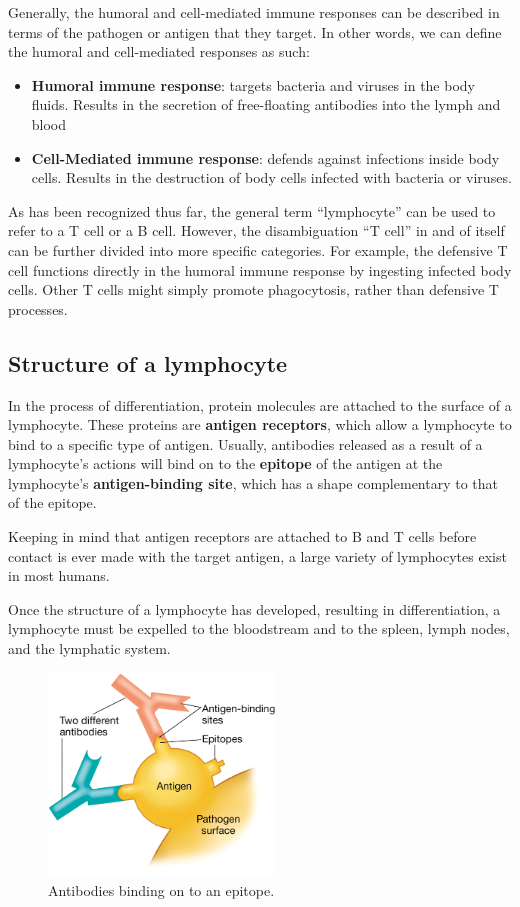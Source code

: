 \documentclass{article}
\begin{document}
Generally, the humoral and cell-mediated immune responses can be described in
terms of the pathogen or antigen that they target. In other words, we can
define the humoral and cell-mediated responses as such:

\begin{itemize}
	\item \textbf{Humoral immune response}: targets bacteria and viruses in the
		body fluids. Results in the secretion of free-floating antibodies into
		the lymph and blood
	\item \textbf{Cell-Mediated immune response}: defends against infections
		inside body cells. Results in the destruction of body cells infected
		with bacteria or viruses.
\end{itemize}

As has been recognized thus far, the general term ``lymphocyte'' can be used to
refer to a T cell or a B cell. However, the disambiguation ``T cell'' in and
of itself can be further divided into more specific categories. For example,
the defensive T cell functions directly in the humoral immune response by
ingesting infected body cells. Other T cells might simply promote phagocytosis,
rather than defensive T processes.

\subsection{Structure of a lymphocyte}

In the process of differentiation, protein molecules are attached to the
surface of a lymphocyte. These proteins are \textbf{antigen receptors}, which
allow a lymphocyte to bind to a specific type of antigen. Usually, antibodies
released as a result of a lymphocyte's actions will bind on to the
\textbf{epitope} of the antigen at the lymphocyte's
\textbf{antigen-binding site}, which has a shape complementary to that of the
epitope.

Keeping in mind that antigen receptors are attached to B and T cells before
contact is ever made with the target antigen, a large variety of lymphocytes
exist in most humans.

Once the structure of a lymphocyte has developed, resulting in differentiation,
a lymphocyte must be expelled to the bloodstream and to the spleen, lymph
nodes, and the lymphatic system.

\begin{figure}[h]
	\centering
	\includegraphics[width=6cm]{antigen_lymphocyte_binding.png}
	\caption{Antibodies binding on to an epitope.}
\end{figure}
\end{document}
